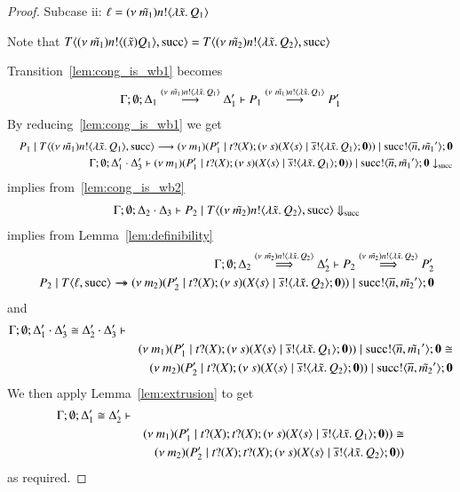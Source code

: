 \begin{proof}
	\noi Subcase ii: $\ell = (\nu\ \tilde{m_1}) n ! \langle \lambda \tilde{x}.\,Q_1 \rangle$

	\noi Note that $T\langle (\nu\ \tilde{m_1}) n ! \langle (\tilde{x}) Q_1 \rangle, \textrm{succ} \rangle = T\langle (\nu\ \tilde{m_2}) n ! \langle \lambda \tilde{x}.\,Q_2 \rangle, \textrm{succ} \rangle$

	\noi Transition~\ref{lem:cong_is_wb1} becomes
	\begin{eqnarray}
		\Gamma; \emptyset; \Delta_1 \stackrel{(\nu\ \tilde{m_1}) n ! \langle \lambda \tilde{x}.\,Q_1 \rangle}{\longrightarrow} \Delta_1' \vdash P_1 \stackrel{(\nu\ \tilde{m_1}) n ! \langle \lambda \tilde{x}.\,Q_1 \rangle}{\longrightarrow} P_1'
		\label{lem:cong_is_wb3}
	\end{eqnarray}
	\noi By reducing~\ref{lem:cong_is_wb1} we get
	\begin{eqnarray*}
		&&P_1 \;|\; T\langle (\nu\ \tilde{m_1}) n ! \langle \lambda \tilde{x}.\,Q_1 \rangle, \textrm{succ} \rangle \longrightarrow (\nu\ m_1)(P_1' \;|\; t ? (X) ; (\nu\ s)(X\langle s \rangle \;|\; \overline{s} ! \langle \lambda \tilde{x}.\,Q_1 \rangle ; \mathbf{0})) \;|\; \textrm{succ} ! \langle \overline{n}, \tilde{m_1}' \rangle ; \mathbf{0} \\
		&&\Gamma; \emptyset; \Delta_1' \cdot \Delta_3' \vdash (\nu\ m_1)(P_1' \;|\; t ? (X) ; (\nu\ s)(X\langle s \rangle \;|\; \overline{s} ! \langle \lambda \tilde{x}.\,Q_1 \rangle ; \mathbf{0})) \;|\; \textrm{succ} ! \langle \overline{n}, \tilde{m_1}' \rangle ; \mathbf{0} \downarrow_{\textrm{succ}}
	\end{eqnarray*}
	\noi implies from~\ref{lem:cong_is_wb2}
	\begin{eqnarray*}
		&&\Gamma; \emptyset; \Delta_2 \cdot \Delta_3 \vdash P_2 \;|\; T\langle (\nu\ \tilde{m_2}) n ! \langle \lambda \tilde{x}.\,Q_2 \rangle, \textrm{succ} \rangle \Downarrow_{\textrm{succ}}
	\end{eqnarray*}
	\noi implies from Lemma~\ref{lem:definibility}
	\begin{eqnarray}
		&&\Gamma; \emptyset; \Delta_2 \stackrel{(\nu\ \tilde{m_2}) n ! \langle \lambda \tilde{x}.\,Q_2 \rangle}{\Longrightarrow} \Delta_2' \vdash P_2 \stackrel{(\nu\ \tilde{m_2}) n ! \langle \lambda \tilde{x}.\,Q_2 \rangle}{\Longrightarrow} P_2'
		\label{lem:cong_is_wb4}\\
		&&P_2 \;|\; T \langle \ell, \textrm{succ} \rangle \rightarrow\!\!\!\!\!\rightarrow (\nu\ m_2)(P_2' \;|\; t ? (X) ; (\nu\ s)(X\langle s \rangle \;|\; \overline{s} ! \langle \lambda \tilde{x}.\,Q_2 \rangle ; \mathbf{0})) \;|\; \textrm{succ} ! \langle \overline{n}, \tilde{m_2}' \rangle ; \mathbf{0} \nonumber
	\end{eqnarray}
	\noi and
	\begin{eqnarray*}
		\Gamma; \emptyset; \Delta_1' \cdot \Delta_3' \cong \Delta_2' \cdot \Delta_3' \vdash\\
		&& (\nu\ m_1)(P_1' \;|\; t ? (X) ; (\nu\ s)(X\langle s \rangle \;|\; \overline{s} ! \langle \lambda \tilde{x}.\,Q_1 \rangle ; \mathbf{0})) \;|\; \textrm{succ} ! \langle \overline{n}, \tilde{m_1}' \rangle ; \mathbf{0} \cong\\
		&& (\nu\ m_2)(P_2' \;|\; t ? (X) ; (\nu\ s)(X\langle s \rangle \;|\; \overline{s} ! \langle \lambda \tilde{x}.\,Q_2 \rangle ; \mathbf{0})) \;|\; \textrm{succ} ! \langle \overline{n}, \tilde{m_2}' \rangle ; \mathbf{0}
	\end{eqnarray*}
	We then apply Lemma~\ref{lem:extrusion} to get
	\begin{eqnarray*}
		\Gamma; \emptyset; \Delta_1' \cong \Delta_2' \vdash\\
		&& (\nu\ m_1)(P_1' \;|\; t ? (X) ; t ? (X) ; (\nu\ s)(X\langle s \rangle \;|\; \overline{s} ! \langle \lambda \tilde{x}.\,Q_1 \rangle ; \mathbf{0})) \cong\\
		&& (\nu\ m_2)(P_2' \;|\; t ? (X) ; t ? (X) ; (\nu\ s)(X\langle s \rangle \;|\; \overline{s} ! \langle \lambda \tilde{x}.\,Q_2 \rangle ; \mathbf{0}))
	\end{eqnarray*}
	\noi as required.


\end{proof}

